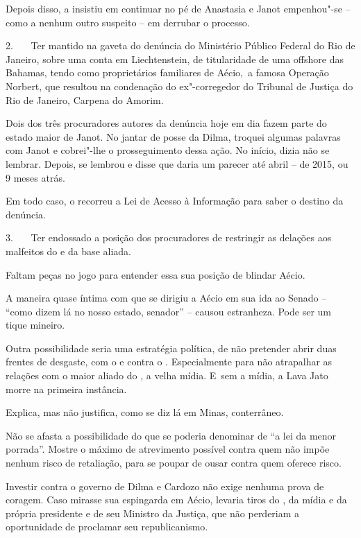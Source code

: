 Depois disso, a  insistiu em continuar no pé de Anastasia e Janot
empenhou"-se -- como a nenhum outro suspeito -- em derrubar o processo.

2.~~~ Ter mantido na gaveta do  denúncia do Ministério Público
Federal do Rio de Janeiro, sobre uma conta em Liechtenstein, de
titularidade de uma offshore das Bahamas, tendo como proprietários
familiares de Aécio,~{a famosa Operação
Norbert}, que resultou na condenação do ex"-corregedor do Tribunal de
Justiça do Rio de Janeiro, Carpena do Amorim.

Dois dos três procuradores autores da denúncia hoje em dia fazem parte
do estado maior de Janot. No jantar de posse da Dilma, troquei algumas
palavras com Janot e cobrei"-lhe o prosseguimento dessa ação. No início,
dizia não se lembrar. Depois, se lembrou e disse que daria um parecer
até abril -- de 2015, ou 9 meses atrás.

Em todo caso, o  recorreu a Lei de Acesso à Informação para saber o
destino da denúncia.

3.~~~ Ter endossado a posição dos procuradores de restringir as delações
aos malfeitos do  e da base aliada.

Faltam peças no jogo para entender essa sua posição de blindar Aécio.

A maneira quase íntima com que se dirigiu a Aécio em sua ida ao Senado
-- ``como dizem lá no nosso estado, senador'' -- causou estranheza. Pode
ser um tique mineiro.

Outra possibilidade seria uma estratégia política, de não pretender
abrir duas frentes de desgaste, com o  e contra o . Especialmente
para não atrapalhar as relações com o maior aliado do , a velha
mídia. E~sem a mídia, a Lava Jato morre na primeira instância.

Explica, mas não justifica, como se diz lá em Minas, conterrâneo.

Não se afasta a possibilidade do que se poderia denominar de ``a lei da
menor porrada''. Mostre o máximo de atrevimento possível contra quem não
impõe nenhum risco de retaliação, para se poupar de ousar contra quem
oferece risco.

Investir contra o governo de Dilma e Cardozo não exige nenhuma prova de
coragem. Caso mirasse sua espingarda em Aécio, levaria tiros do , da
mídia e da própria presidente e de seu Ministro da Justiça, que não
perderiam a oportunidade de proclamar seu republicanismo.


